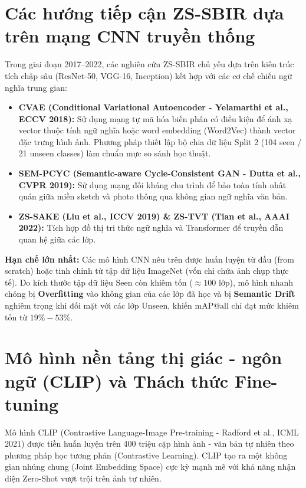 \documentclass[12pt,a4paper]{report}
\begin{document}
\section{Các hướng tiếp cận ZS-SBIR dựa trên mạng CNN truyền thống}
Trong giai đoạn 2017--2022, các nghiên cứu ZS-SBIR chủ yếu dựa trên kiến trúc tích chập sâu (ResNet-50, VGG-16, Inception) kết hợp với các cơ chế chiếu ngữ nghĩa trung gian:
\begin{itemize}[leftmargin=*]
    \item \textbf{CVAE (Conditional Variational Autoencoder - Yelamarthi et al., ECCV 2018):} Sử dụng mạng tự mã hóa biến phân có điều kiện để ánh xạ vector thuộc tính ngữ nghĩa hoặc word embedding (Word2Vec) thành vector đặc trưng hình ảnh. Phương pháp thiết lập bộ chia dữ liệu Split 2 (104 seen / 21 unseen classes) làm chuẩn mực so sánh học thuật.
    \item \textbf{SEM-PCYC (Semantic-aware Cycle-Consistent GAN - Dutta et al., CVPR 2019):} Sử dụng mạng đối kháng chu trình để bảo toàn tính nhất quán giữa miền sketch và photo thông qua không gian ngữ nghĩa văn bản.
    \item \textbf{ZS-SAKE (Liu et al., ICCV 2019) \& ZS-TVT (Tian et al., AAAI 2022):} Tích hợp đồ thị tri thức ngữ nghĩa và Transformer để truyền dẫn quan hệ giữa các lớp.
\end{itemize}

\textbf{Hạn chế lớn nhất:} Các mô hình CNN nêu trên được huấn luyện từ đầu (from scratch) hoặc tinh chỉnh từ tập dữ liệu ImageNet (vốn chỉ chứa ảnh chụp thực tế). Do kích thước tập dữ liệu Seen còn khiêm tốn ($\approx 100$ lớp), mô hình nhanh chóng bị \textbf{Overfitting} vào không gian của các lớp đã học và bị \textbf{Semantic Drift} nghiêm trọng khi đối mặt với các lớp Unseen, khiến $\text{mAP@all}$ chỉ đạt mức khiêm tốn từ $19\% - 53\%$.

\section{Mô hình nền tảng thị giác - ngôn ngữ (CLIP) và Thách thức Fine-tuning}
Mô hình CLIP (Contrastive Language-Image Pre-training - Radford et al., ICML 2021) được tiền huấn luyện trên 400 triệu cặp hình ảnh - văn bản tự nhiên theo phương pháp học tương phản (Contrastive Learning). CLIP tạo ra một không gian nhúng chung (Joint Embedding Space) cực kỳ mạnh mẽ với khả năng nhận diện Zero-Shot vượt trội trên ảnh tự nhiên.
\end{document}
